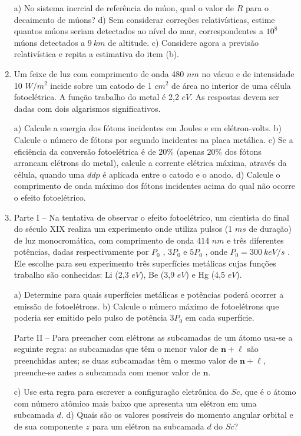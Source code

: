 \begin{enumerate}[start=1,label={\bfseries Q\arabic*.}]
  a) No sistema inercial de referência do múon, qual o valor de $R$ para o decaimento de múons?
  d) Sem considerar correções relativísticas, estime quantos múons seriam detectados ao nível do mar, correspondentes a $10^{8}$ múons detectados a $9 \ km$ de altitude.
  c) Considere agora a previsão relativística e repita a estimativa do item (b).




\item Um feixe de luz com comprimento de onda 480 $nm$ no vácuo e de intensidade 10 $W/m^{2}$ incide sobre um catodo de 1 $cm^{2}$ de área no interior de uma célula fotoelétrica. A função trabalho do metal é 2,2 $eV$. As respostas devem ser dadas com dois algarismos significativos.


a) Calcule a energia dos fótons incidentes em Joules e em elétron-volts.
b) Calcule o número de fótons por segundo incidentes na placa metálica.
c) Se a eficiência da conversão fotoelétrica é de $20\%$ (apenas $20\%$ dos fótons arrancam elétrons do metal), calcule a corrente elétrica máxima, através da célula, quando uma $ddp$ é aplicada entre o catodo e o anodo.
d) Calcule o comprimento de onda máximo dos fótons incidentes acima do qual não ocorre o efeito fotoelétrico.



\item Parte I – Na tentativa de observar o efeito fotoelétrico, um cientista do final do século XIX realiza um experimento onde utiliza pulsos (1 $ms$ de duração) de luz monocromática, com comprimento de onda 414 $nm$ e três diferentes potências, dadas respectivamente por $P_{0}$ , $3P_{0}$ e $5P_{0}$ , onde $P_{0} = 300 \ keV/s$ . Ele escolhe para seu experimento três superfícies metálicas cujas funções trabalho são conhecidas: Li (2,3 $eV$), Be (3,9 $eV$) e Hg (4,5 $eV$).

a) Determine para quais superfícies metálicas e potências poderá ocorrer a emissão de fotoelétrons.
b) Calcule o número máximo de fotoelétrons que poderia ser emitido pelo pulso de potência $3P_{0}$ em cada superfície.

Parte II – Para preencher com elétrons as subcamadas de um átomo usa-se a seguinte regra: as subcamadas que têm o menor valor de $\boldsymbol{n + \ell}$ são preenchidas antes; se duas subcamadas têm o mesmo valor de $\boldsymbol{n + \ell}$, preenche-se antes a subcamada com menor valor de $\mathbf{n}$.

c) Use esta regra para escrever a configuração eletrônica do $Sc$, que é o átomo com número atômico mais baixo que apresenta um elétron em uma subcamada $d$.
d) Quais são os valores possíveis do momento angular orbital e de sua componente $z$ para um elétron na subcamada $d$ do $Sc$?





\end{enumerate}
